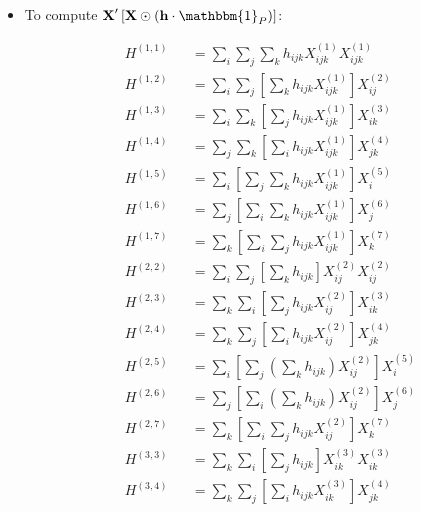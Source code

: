 \documentclass[12pt]{article}
\begin{document}
\begin{itemize}
\item To compute $\textbf{X}' \left[ \textbf{X} \odot \left(\textbf{h} \cdot \mathbbm{1}_P \right) \right]$:
\clearpage
\begin{multicols}{2}
	\begin{equation*}
	\begin{aligned}
		& H^{(1,1)} && = \sum_{i} \sum_{j} \sum_{k} h_{ijk} X^{(1)}_{ijk} X^{(1)}_{ijk} \\
		& H^{(1,2)} && = \sum_{i} \sum_{j} \left[ \sum_{k} h_{ijk} X^{(1)}_{ijk} \right] X^{(2)}_{ij} \\
		& H^{(1,3)} && = \sum_{i} \sum_{k} \left[ \sum_{j} h_{ijk} X^{(1)}_{ijk} \right] X^{(3)}_{ik} \\
		& H^{(1,4)} && = \sum_{j} \sum_{k} \left[ \sum_{i} h_{ijk} X^{(1)}_{ijk} \right] X^{(4)}_{jk} \\
		& H^{(1,5)} && = \sum_{i} \left[ \sum_{j} \sum_{k} h_{ijk} X^{(1)}_{ijk} \right] X^{(5)}_{i} \\
		& H^{(1,6)} && = \sum_{j} \left[ \sum_{i} \sum_{k} h_{ijk} X^{(1)}_{ijk} \right] X^{(6)}_{j} \\
		& H^{(1,7)} && = \sum_{k} \left[ \sum_{i} \sum_{j} h_{ijk} X^{(1)}_{ijk} \right] X^{(7)}_{k} \\
		& H^{(2,2)} && = \sum_{i} \sum_{j} \left[\sum_{k} h_{ijk} \right] X^{(2)}_{ij} X^{(2)}_{ij} \\
		& H^{(2,3)} && = \sum_{k} \sum_{i} \left[ \sum_{j} h_{ijk} X^{(2)}_{ij} \right] X^{(3)}_{ik} \\
		& H^{(2,4)} && = \sum_{k} \sum_{j} \left[ \sum_{i}  h_{ijk} X^{(2)}_{ij} \right] X^{(4)}_{jk} \\
		& H^{(2,5)} && = \sum_{i} \left[  \sum_{j} \left( \sum_{k} h_{ijk} \right) X^{(2)}_{ij} \right] X^{(5)}_{i} \\
		& H^{(2,6)} && = \sum_{j} \left[ \sum_{i} \left( \sum_{k} h_{ijk} \right) X^{(2)}_{ij} \right] X^{(6)}_{j} \\
		& H^{(2,7)} && = \sum_{k} \left[ \sum_{i} \sum_{j} h_{ijk} X^{(2)}_{ij} \right] X^{(7)}_{k} \\
		& H^{(3,3)} && = \sum_{k} \sum_{i} \left[ \sum_{j} h_{ijk} \right] X^{(3)}_{ik} X^{(3)}_{ik} \\
		& H^{(3,4)} && = \sum_{k} \sum_{j} \left[ \sum_{i}  h_{ijk} X^{(3)}_{ik} \right] X^{(4)}_{jk} \\
	\end{aligned}
	\end{equation*}
	\columnbreak
	\begin{equation*}

\end{equation*}
\end{multicols}
\end{itemize}
\end{document}
